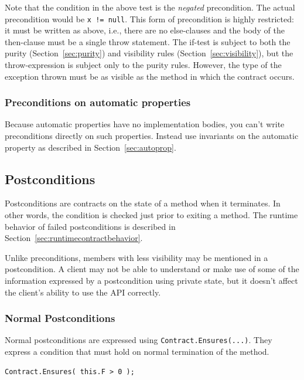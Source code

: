 \documentclass{article}
\newcommand{\code}[1]{\lstinline{#1}}
\begin{document}
Note that the condition in the above test is the \emph{negated}
precondition.  The actual precondition would be \code{x != null}. This
form of precondition is highly restricted: it must be written as
above, i.e., there are no else-clauses and the body of the then-clause
must be a single throw statement. The if-test is subject to both the
purity (Section~\ref{sec:purity}) and visibility rules
(Section~\ref{sec:visibility}), but the throw-expression is subject
only to the purity rules. However, the type of the exception thrown
must be as visible as the method in which the contract occurs.

\subsubsection{Preconditions on automatic properties}
Because automatic properties have no implementation bodies, you can't
write preconditions directly on such properties. Instead use
invariants on the automatic property as described in
Section~\ref{sec:autoprop}.

\subsection{Postconditions}
\label{sec:ensures}
Postconditions are contracts on the state of a
method when it terminates. In other words, the condition is checked
just prior to exiting a method. The runtime behavior of failed postconditions
is described in Section~\ref{sec:runtimecontractbehavior}.

Unlike preconditions, members with less visibility may be mentioned in
a postcondition. A client may not be able to understand or make use of
some of the information expressed by a postcondition using private
state, but it doesn't affect the client's ability to use the API
correctly. 

\subsubsection{Normal Postconditions}
Normal postconditions are expressed using \code{Contract.Ensures(...)}. They
express a condition that must hold on normal termination of the
method.  
\begin{lstlisting}
Contract.Ensures( this.F > 0 );
\end{lstlisting}
\end{document}
